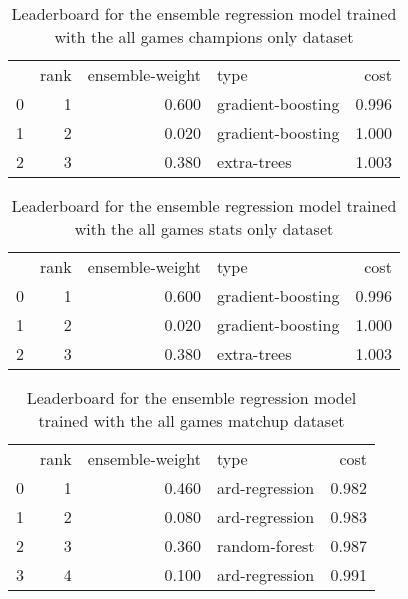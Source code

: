 \begin{table}[]
	\centering
	\begin{tabular}{lrrlr}
		  & rank & ensemble-weight & type              & cost  \\
		0 & 1    & 0.600           & gradient-boosting & 0.996 \\
		1 & 2    & 0.020           & gradient-boosting & 1.000 \\
		2 & 3    & 0.380           & extra-trees       & 1.003 \\
	\end{tabular}

	\caption{Leaderboard for the ensemble regression model trained with the all games champions only dataset}
	\label{tab:lb-reg-all-games-champs-only}
\end{table}

\begin{table}[]
	\centering
	\begin{tabular}{lrrlr}
		  & rank & ensemble-weight & type              & cost  \\
		0 & 1    & 0.600           & gradient-boosting & 0.996 \\
		1 & 2    & 0.020           & gradient-boosting & 1.000 \\
		2 & 3    & 0.380           & extra-trees       & 1.003 \\
	\end{tabular}

	\caption{Leaderboard for the ensemble regression model trained with the all games stats only dataset}
	\label{tab:lb-reg-all-games-champ-stats-only}
\end{table}

\begin{table}[]
	\centering
	\begin{tabular}{lrrlr}
		  & rank & ensemble-weight & type           & cost  \\
		0 & 1    & 0.460           & ard-regression & 0.982 \\
		1 & 2    & 0.080           & ard-regression & 0.983 \\
		2 & 3    & 0.360           & random-forest  & 0.987 \\
		3 & 4    & 0.100           & ard-regression & 0.991 \\
	\end{tabular}

	\caption{Leaderboard for the ensemble regression model trained with the all games matchup dataset}
	\label{tab:lb-reg-all-games-matchups}
\end{table}

